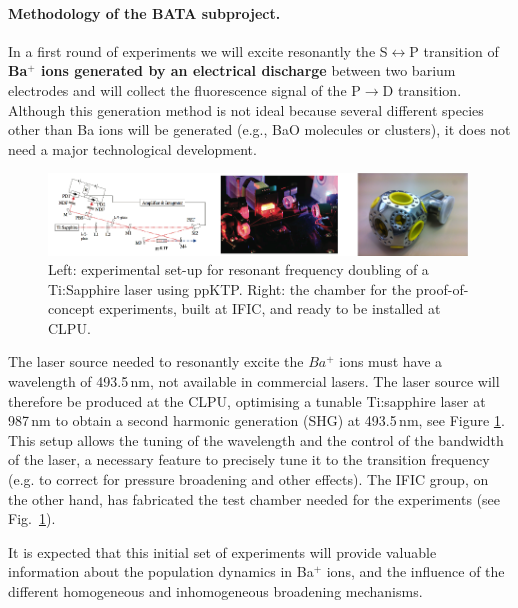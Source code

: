 \paragraph{Methodology of the BATA subproject.}

In a first round of experiments we will excite resonantly the S$\leftrightarrow$P transition of {\bf Ba$^+$ ions generated by an electrical discharge} between two barium electrodes and will collect the fluorescence signal of the P$\rightarrow$D transition. Although this generation method is not ideal because several different species other than Ba ions will be generated (e.g., BaO molecules or clusters), it does not need a major technological development. 

\begin{figure}
\begin{center}
\includegraphics[width=0.99\textwidth]{img/blueLaser.png}
\caption{\small Left: experimental set-up for resonant frequency doubling of a 
Ti:Sapphire laser using ppKTP. Right: the chamber for the proof-of-concept experiments, built at IFIC, and ready to be installed at CLPU.}
\label{fig:chamber}
\end{center}
\end{figure}

The laser source needed to resonantly excite the $Ba^{+}$ ions must have a wavelength of 493.5\,nm, not available in commercial lasers. The laser source will therefore be produced at the CLPU, optimising a tunable Ti:sapphire laser at 987\,nm to obtain a second harmonic generation (SHG) at 493.5\,nm, see Figure \ref{fig:chamber}. This setup allows the tuning of the wavelength and the control of the bandwidth of the laser, a necessary feature to precisely tune it to the transition frequency (e.g. to correct for pressure broadening and other effects). The IFIC group, on the other hand, has fabricated the test chamber needed for the experiments (see Fig.~\ref{fig:chamber}). 

It is expected that this initial set of experiments will provide valuable information about the population dynamics in Ba$^+$ ions, and the influence of the different homogeneous and inhomogeneous broadening mechanisms. 

